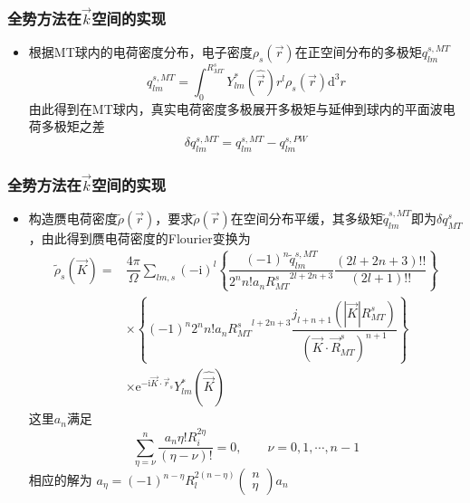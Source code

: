 \frame
{
	\frametitle{全势方法在$\vec k$空间的实现}
\begin{itemize}
	\item 根据\textrm{MT}球内的电荷密度分布，电子密度$\rho_s(\vec r)$在正空间分布的多极矩$q_{lm}^{s,MT}$
\begin{displaymath}
	q_{lm}^{s,MT}=\int_0^{R_{MT}^s}Y_{lm}^{\ast}(\hat{\vec r})r^l\rho_s(\vec r)\mathrm{d}^3r
\end{displaymath}
由此得到在\textrm{MT}球内，真实电荷密度多极展开多极矩与延伸到球内的平面波电荷多极矩之差
	\begin{displaymath}
		\delta q_{lm}^{s,MT}=q_{lm}^{s,MT}-q_{lm}^{s,PW}
	\end{displaymath}
\end{itemize}
}

\frame
{
	\frametitle{全势方法在$\vec k$空间的实现}
\begin{itemize}
	\item 构造赝电荷密度$\tilde\rho(\vec r)$，要求$\tilde\rho(\vec r)$在空间分布平缓，其多级矩$\tilde q_{lm}^{s,MT}$即为$\delta q_{MT}^s$，由此得到赝电荷密度的\textrm{Flourier}变换为
	\begin{displaymath}
		\begin{aligned}
			\tilde\rho_s(\vec K)=&\dfrac{4\pi}{\Omega}\sum_{lm,s}(-\mathrm{i})^l\left\{\dfrac{(-1)^n\tilde q_{lm}^{s,MT}}{2^nn!a_n{R_{MT}^s}^{2l+2n+3}}\dfrac{(2l+2n+3)!!}{(2l+1)!!}\right\}\\
			&\times\left\{(-1)^n2^nn!a_n{R_{MT}^s}^{l+2n+3}\dfrac{j_{l+n+1}(|\vec K|R_{MT}^s)}{(\vec K\cdot\vec R_{MT}^s)^{n+1}}\right\}\\
			&\times\mathrm{e}^{\mathrm{-i}\vec K\cdot\vec r_s}Y_{lm}^{\ast}(\hat{\vec K})
		\end{aligned}
	\end{displaymath}
	这里$a_n$满足
	\begin{displaymath}
		\sum_{\eta=\nu}^n\dfrac{a_n\eta!R_i^{2\eta}}{(\eta-\nu)!}=0,\qquad \nu=0,1,\cdots,n-1
	\end{displaymath}
	相应的解为
	$a_{\eta}=(-1)^{n-\eta}R_l^{2(n-\eta)}
	\begin{pmatrix}
		n\\\eta
	\end{pmatrix}
	a_n$
\end{itemize}
}

